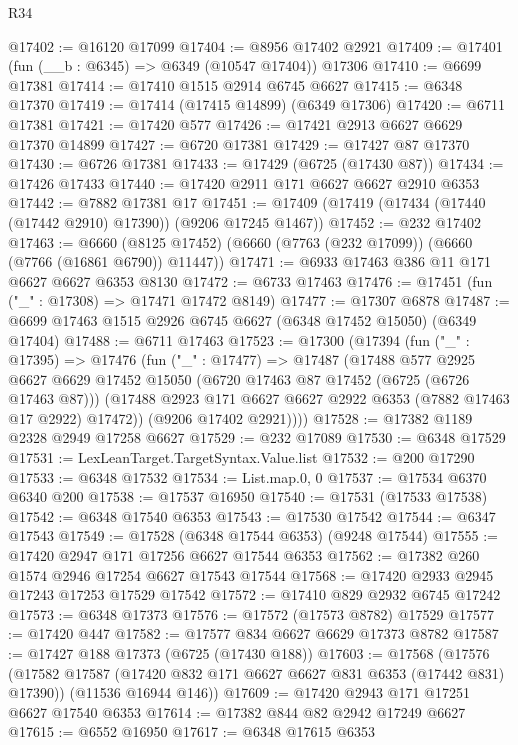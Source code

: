 \begin{lexlean}{R34}
\begin{coremodule}
@17402 := @16120 @17099
@17404 := @8956 @17402 @2921
@17409 := @17401 (fun (__b : @6345) => @6349 (@10547 @17404)) @17306
@17410 := @6699 @17381
@17414 := @17410 @1515 @2914 @6745 @6627
@17415 := @6348 @17370
@17419 := @17414 (@17415 @14899) (@6349 @17306)
@17420 := @6711 @17381
@17421 := @17420 @577
@17426 := @17421 @2913 @6627 @6629 @17370 @14899
@17427 := @6720 @17381
@17429 := @17427 @87 @17370
@17430 := @6726 @17381
@17433 := @17429 (@6725 (@17430 @87))
@17434 := @17426 @17433
@17440 := @17420 @2911 @171 @6627 @6627 @2910 @6353
@17442 := @7882 @17381 @17
@17451 := @17409 (@17419 (@17434 (@17440 (@17442 @2910) @17390)) (@9206 @17245 @1467))
@17452 := @232 @17402
@17463 := @6660 (@8125 @17452) (@6660 (@7763 (@232 @17099)) (@6660 (@7766 (@16861 @6790)) @11447))
@17471 := @6933 @17463 @386 @11 @171 @6627 @6627 @6353 @8130
@17472 := @6733 @17463
@17476 := @17451 (fun ("_" : @17308) => @17471 @17472 @8149)
@17477 := @17307 @6878
@17487 := @6699 @17463 @1515 @2926 @6745 @6627 (@6348 @17452 @15050) (@6349 @17404)
@17488 := @6711 @17463
@17523 := @17300
    (@17394
      (fun ("_" : @17395) =>
      @17476
        (fun ("_" : @17477) =>
        @17487
          (@17488
            @577
            @2925
            @6627
            @6629
            @17452
            @15050
            (@6720 @17463 @87 @17452 (@6725 (@6726 @17463 @87)))
            (@17488 @2923 @171 @6627 @6627 @2922 @6353 (@7882 @17463 @17 @2922) @17472))
          (@9206 @17402 @2921))))
@17528 := @17382 @1189 @2328 @2949 @17258 @6627
@17529 := @232 @17089
@17530 := @6348 @17529
@17531 := LexLeanTarget.TargetSyntax.Value.list
@17532 := @200 @17290
@17533 := @6348 @17532
@17534 := List.map.{0, 0}
@17537 := @17534 @6370 @6340 @200
@17538 := @17537 @16950
@17540 := @17531 (@17533 @17538)
@17542 := @6348 @17540 @6353
@17543 := @17530 @17542
@17544 := @6347 @17543
@17549 := @17528 (@6348 @17544 @6353) (@9248 @17544)
@17555 := @17420 @2947 @171 @17256 @6627 @17544 @6353
@17562 := @17382 @260 @1574 @2946 @17254 @6627 @17543 @17544
@17568 := @17420 @2933 @2945 @17243 @17253 @17529 @17542
@17572 := @17410 @829 @2932 @6745 @17242
@17573 := @6348 @17373
@17576 := @17572 (@17573 @8782) @17529
@17577 := @17420 @447
@17582 := @17577 @834 @6627 @6629 @17373 @8782
@17587 := @17427 @188 @17373 (@6725 (@17430 @188))
@17603 := @17568
    (@17576
      (@17582 @17587 (@17420 @832 @171 @6627 @6627 @831 @6353 (@17442 @831) @17390))
      (@11536 @16944 @146))
@17609 := @17420 @2943 @171 @17251 @6627 @17540 @6353
@17614 := @17382 @844 @82 @2942 @17249 @6627
@17615 := @6552 @16950
@17617 := @6348 @17615 @6353

\end{coremodule}
\end{lexlean}
